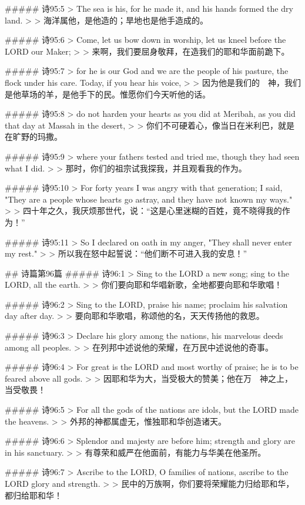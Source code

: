 ##### 诗95:5
> The sea is his, for he made it, and his hands formed the dry land.
>
> 海洋属他，是他造的；旱地也是他手造成的。


##### 诗95:6
> Come, let us bow down in worship, let us kneel before the LORD our Maker;
>
> 来啊，我们要屈身敬拜，在造我们的耶和华面前跪下。


##### 诗95:7
> for he is our God and we are the people of his pasture, the flock under his care. Today, if you hear his voice,
>
> 因为他是我们的　神，我们是他草场的羊，是他手下的民。惟愿你们今天听他的话。


##### 诗95:8
> do not harden your hearts as you did at Meribah, as you did that day at Massah in the desert,
>
> 你们不可硬着心，像当日在米利巴，就是在旷野的玛撒。


##### 诗95:9
> where your fathers tested and tried me, though they had seen what I did.
>
> 那时，你们的祖宗试我探我，并且观看我的作为。


##### 诗95:10
> For forty years I was angry with that generation; I said, "They are a people whose hearts go astray, and they have not known my ways."
>
> 四十年之久，我厌烦那世代，说：“这是心里迷糊的百姓，竟不晓得我的作为！”


##### 诗95:11
> So I declared on oath in my anger, "They shall never enter my rest."
>
> 所以我在怒中起誓说：“他们断不可进入我的安息！”


## 诗篇第96篇
##### 诗96:1
> Sing to the LORD a new song; sing to the LORD, all the earth.
>
> 你们要向耶和华唱新歌，全地都要向耶和华歌唱！


##### 诗96:2
> Sing to the LORD, praise his name; proclaim his salvation day after day.
>
> 要向耶和华歌唱，称颂他的名，天天传扬他的救恩。


##### 诗96:3
> Declare his glory among the nations, his marvelous deeds among all peoples.
>
> 在列邦中述说他的荣耀，在万民中述说他的奇事。


##### 诗96:4
> For great is the LORD and most worthy of praise; he is to be feared above all gods.
>
> 因耶和华为大，当受极大的赞美；他在万　神之上，当受敬畏！


##### 诗96:5
> For all the gods of the nations are idols, but the LORD made the heavens.
>
> 外邦的神都属虚无，惟独耶和华创造诸天。


##### 诗96:6
> Splendor and majesty are before him; strength and glory are in his sanctuary.
>
> 有尊荣和威严在他面前，有能力与华美在他圣所。


##### 诗96:7
> Ascribe to the LORD, O families of nations, ascribe to the LORD glory and strength.
>
> 民中的万族啊，你们要将荣耀能力归给耶和华，都归给耶和华！


